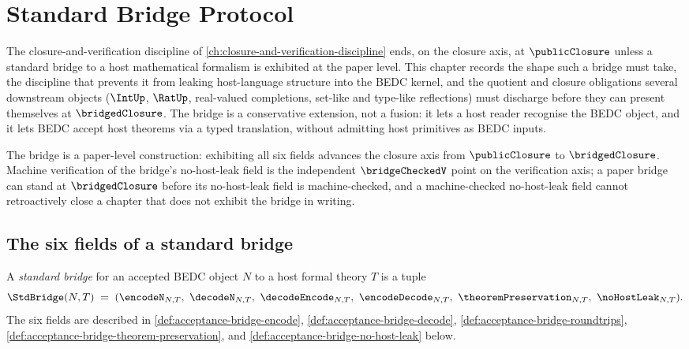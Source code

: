 \chapter{Standard Bridge Protocol}
\label{ch:acceptance-bridge}

The closure-and-verification discipline of \autoref{ch:closure-and-verification-discipline} ends, on the closure axis, at $\publicClosure$ unless a standard bridge to a host mathematical formalism is exhibited at the paper level. This chapter records the shape such a bridge must take, the discipline that prevents it from leaking host-language structure into the BEDC kernel, and the quotient and closure obligations several downstream objects ($\IntUp$, $\RatUp$, real-valued completions, set-like and type-like reflections) must discharge before they can present themselves at $\bridgedClosure$. The bridge is a conservative extension, not a fusion: it lets a host reader recognise the BEDC object, and it lets BEDC accept host theorems via a typed translation, without admitting host primitives as BEDC inputs.

The bridge is a paper-level construction: exhibiting all six fields advances the closure axis from $\publicClosure$ to $\bridgedClosure$. Machine verification of the bridge's no-host-leak field is the independent $\bridgeCheckedV$ point on the verification axis; a paper bridge can stand at $\bridgedClosure$ before its no-host-leak field is machine-checked, and a machine-checked no-host-leak field cannot retroactively close a chapter that does not exhibit the bridge in writing.

\section{The six fields of a standard bridge}
\label{sec:acceptance-bridge-six-fields}

\begin{definition}
\label{def:acceptance-standard-bridge}
A \emph{standard bridge} for an accepted BEDC object $N$ to a host formal theory $T$ is a tuple
$$
  \StdBridge(N,T) \;=\; (\encodeN_{N,T},\ \decodeN_{N,T},\ \decodeEncode_{N,T},\ \encodeDecode_{N,T},\ \theoremPreservation_{N,T},\ \noHostLeak_{N,T}).
$$
The six fields are described in \autoref{def:acceptance-bridge-encode}, \autoref{def:acceptance-bridge-decode}, \autoref{def:acceptance-bridge-roundtrips}, \autoref{def:acceptance-bridge-theorem-preservation}, and \autoref{def:acceptance-bridge-no-host-leak} below.
\end{definition}

